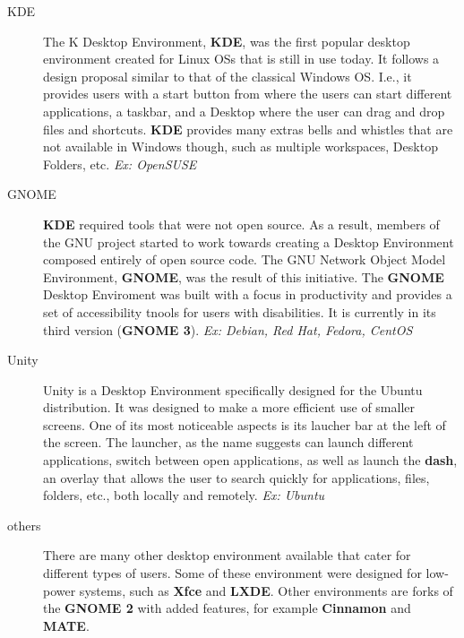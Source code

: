 \begin{description}
\item[KDE]  The K Desktop Environment, \textbf{KDE}, was the first popular desktop environment created for Linux \acs{OS}s that is still in use today. It follows a design proposal similar to that of the classical Windows \acs{OS}. I.e., it provides users with a start button from where the users can start different applications, a taskbar, and a Desktop where the user can drag and drop files and shortcuts. \textbf{KDE} provides many extras bells and whistles that are not available in Windows though, such as multiple workspaces, Desktop Folders, etc. \textit{Ex: OpenSUSE}
\item[GNOME] \textbf{KDE} required tools that were not open source. As a result, members of the \acs{GNU} project started to work towards creating a Desktop Environment composed entirely of open source code. The \acs{GNU} Network Object Model Environment, \textbf{GNOME}, was the result of this initiative. The \textbf{GNOME} Desktop Enviroment was built with a focus in productivity and provides a set of accessibility tnools for users with disabilities. It is currently in its third version (\textbf{GNOME 3}). \textit{Ex: Debian, Red Hat, Fedora, CentOS}
\item[Unity] Unity is a Desktop Environment specifically designed for the Ubuntu distribution. It was designed to make a more efficient use of smaller screens. One of its most noticeable aspects is its laucher bar at the left of the screen. The launcher, as the name suggests can launch different applications, switch between open applications, as well as launch the \textbf{dash}, an overlay that allows the user to search quickly for applications, files, folders, etc., both locally and remotely. \textit{Ex: Ubuntu}
\item[others] There are many other desktop environment available that cater for different types of users. Some of these environment were designed for low-power systems, such as \textbf{Xfce} and \textbf{LXDE}. Other environments are forks of the \textbf{GNOME 2} with added features, for example \textbf{Cinnamon} and \textbf{MATE}.
\end{description}

